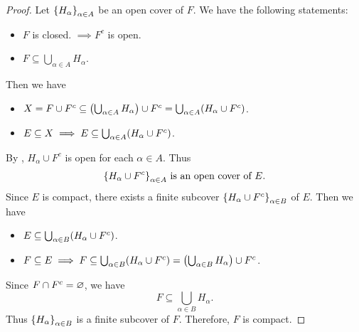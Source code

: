\begin{proof}
    Let $\set*{H_{\alpha}}_{\alpha \in A}$ be an open cover of $F$. We have the following statements:
    \begin{itemize}
        \item $F$ is closed. $\implies F^{c}$ is open.
        \item $F \subseteq \bigcup_{\alpha \in A} H_{\alpha}$.
    \end{itemize}
    Then we have
    \begin{itemize}
        \item $X = F \cup F^{c} \subseteq \paren*{\bigcup_{\alpha \in A}
        H_{\alpha}} \cup F^{c} = \bigcup_{\alpha \in A} \paren*{H_{\alpha} \cup F^{c}}$.
        \item $E \subseteq X \implies E \subseteq \bigcup_{\alpha \in A} \paren*{H_{\alpha} \cup F^{c}}$.
    \end{itemize}
    By , $H_{\alpha} \cup F^{c}$ is open for each $\alpha \in A$. Thus
    \[
    \set*{H_{\alpha} \cup F^{c}}_{\alpha \in A} \text{ is an open cover of } E.
    \]
    Since $E$ is compact, there exists a finite subcover $\set*{H_{\alpha} \cup F^{c}}_{\alpha \in B}$ of $E$. Then we have
    \begin{itemize}
        \item $E \subseteq \bigcup_{\alpha \in B} \paren*{H_{\alpha} \cup F^{c}}$.
        \item $F \subseteq E \implies F \subseteq \bigcup_{\alpha \in B}
        \paren*{H_{\alpha} \cup F^{c}} = \paren*{\bigcup_{\alpha \in B} H_{\alpha}} \cup F^{c}$.
    \end{itemize}
    Since $F \cap F^{c} = \vnot$, we have
    \[
    F \subseteq \bigcup_{\alpha \in B} H_{\alpha}.
    \]
    Thus $\set*{H_{\alpha}}_{\alpha \in B}$ is a finite subcover of $F$. Therefore, $F$ is compact.
\end{proof}
